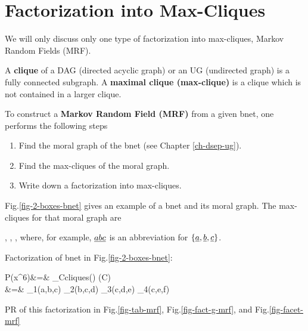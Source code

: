 \section{Factorization into Max-Cliques}

We will
only discuss only one type of factorization
into max-cliques, {Markov Random Fields (MRF)}.

A {\bf clique} of a DAG (directed acyclic graph)
or an UG (undirected graph) is a fully connected subgraph. A {\bf maximal clique (max-clique)} is a clique which is not contained in a larger clique.

To construct a {\bf Markov Random Field (MRF)} from a given bnet, one performs the
following steps

\begin{enumerate}
\item Find the moral graph of the bnet (see Chapter \ref{ch-dsep-ug}).
\item Find the max-cliques of the moral graph.
\item Write down a factorization into
max-cliques.
\end{enumerate}


Fig.\ref{fig-2-boxes-bnet} gives an example of a bnet and its moral graph.
The max-cliques for that moral graph are

\beq
\rva\rvb\rvc, \rvb\rvc\rvd, \rvc\rvd\rve, \rvc\rve\rvf
\eeq
where, for example, $\rva\rvb\rvc$
is an abbreviation for $\{\rva, \rvb, \rvc\}$.

Factorization  of bnet in Fig.\ref{fig-2-boxes-bnet}:

\beqa
P(x^6)&=&
\prod_{C\in cliques(\calb)}
\phi(C)
\\
&=&
\phi_1(a,b,c)
\quad\phi_2(b,c,d)
\quad\phi_3(c,d,e)
\quad\phi_4(c,e,f)
\eeqa

PR of this factorization in Fig.\ref{fig-tab-mrf},
Fig.\ref{fig-fact-g-mrf}, and
Fig.\ref{fig-facet-mrf}

